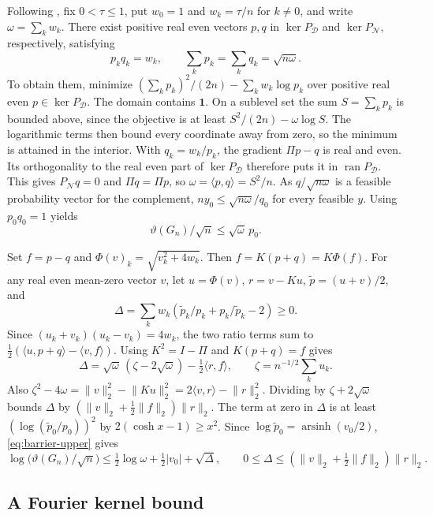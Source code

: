 \documentclass[11pt,letterpaper]{article}
\newcommand{\one}{\mathbf 1}
\newcommand{\abs}[1]{\lvert #1\rvert}
\newcommand{\norm}[1]{\lVert #1\rVert}
\begin{document}
Following \cite{CHHWY}, fix \(0<\tau\le1\), put \(w_0=1\) and
\(w_k=\tau/n\) for \(k\ne0\), and write \(\omega=\sum_k w_k\).
There exist positive real even vectors \(p,q\) in \(\ker P_{\mathcal D}\)
and \(\ker P_{\mathcal N}\), respectively, satisfying
\[
 p_kq_k=w_k,\qquad \sum_k p_k=\sum_k q_k=\sqrt{n\omega}.
\]
To obtain them, minimize
\((\sum_k p_k)^2/(2n)-\sum_k w_k\log p_k\) over positive real even
\(p\in\ker P_{\mathcal D}\). The domain contains \(\one\).
On a sublevel set the sum \(S=\sum_k p_k\) is bounded above, since the
objective is at least \(S^2/(2n)-\omega\log S\). The logarithmic terms then
bound every coordinate away from zero, so the minimum is attained
in the interior. With \(q_k=w_k/p_k\), the gradient \(\Pi p-q\) is
real and even. Its orthogonality to the real even part of
\(\ker P_{\mathcal D}\) therefore puts it in
\(\operatorname{ran}P_{\mathcal D}\). This gives
\(P_{\mathcal N}q=0\) and \(\Pi q=\Pi p\), so
\(\omega=\langle p,q\rangle=S^2/n\). As \(q/\sqrt{n\omega}\) is a feasible
probability vector for the complement, \(ny_0\le\sqrt{n\omega}/q_0\)
for every feasible \(y\). Using \(p_0q_0=1\) yields
\begin{equation}\label{eq:barrier-upper}
 \vartheta(G_n)/\sqrt n\le\sqrt\omega\,p_0.
\end{equation}

Set \(f=p-q\) and \(\Phi(v)_k=\sqrt{v_k^2+4w_k}\). Then
\(f=K(p+q)=K\Phi(f)\). For any real even mean-zero vector \(v\), let
\(u=\Phi(v)\), \(r=v-Ku\), \(\widetilde p=(u+v)/2\), and
\[
 \Delta=\sum_k w_k(\widetilde p_k/p_k+p_k/\widetilde p_k-2)\ge0.
\]
Since \((u_k+v_k)(u_k-v_k)=4w_k\), the two ratio terms sum to
\(\tfrac12(\langle u,p+q\rangle-\langle v,f\rangle)\). Using
\(K^2=I-\Pi\) and \(K(p+q)=f\) gives
\[
 \Delta=\sqrt\omega\,(\zeta-2\sqrt\omega)-\tfrac12\langle r,f\rangle,
 \qquad \zeta=n^{-1/2}\sum_k u_k.
\]
Also \(\zeta^2-4\omega=\norm{v}_2^2-\norm{Ku}_2^2=2\langle v,r\rangle-\norm{r}_2^2\).
Dividing by \(\zeta+2\sqrt\omega\) bounds \(\Delta\) by
\((\norm v_2+\tfrac12\norm f_2)\norm r_2\).
The term at zero in \(\Delta\) is at least \((\log(\widetilde p_0/p_0))^2\)
by \(2(\cosh x-1)\ge x^2\). Since
\(\log\widetilde p_0=\operatorname{arsinh}(v_0/2)\),
\eqref{eq:barrier-upper} gives
\begin{equation}\label{eq:residual}
 \log\bigl(\vartheta(G_n)/\sqrt n\bigr)
 \le \tfrac12\log\omega+\tfrac12\abs{v_0}+\sqrt\Delta,
 \qquad 0\le\Delta\le(\norm v_2+\tfrac12\norm f_2)\norm r_2.
\end{equation}

\subsection{A Fourier kernel bound}
\end{document}
